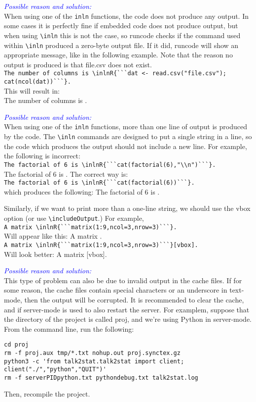 \documentclass[a4paper,10pt]{article}
\newcommand{\cause}[1] {\noindent\textit{\textcolor{blue}{Possible reason and solution:}}\\#1}
\begin{document}
\cause\bgroup
When using one of the \verb|inln| functions, the code does not produce any output.
In some cases it is perfectly fine if embedded code does not produce output, but when using \verb|\inln| this is not the case, so runcode checks if the command used within \verb|\inln| produced a zero-byte output file. If it did, runcode will show an appropriate message, like in the following example. Note that the reason no output is produced is that file.csv does not exist.\\
\verb|The number of columns is \inlnR{```dat <- read.csv("file.csv"); cat(ncol(dat))```}.|\\
This will result in:\\
The number of columns is  .\\
\egroup

\cause\bgroup
When using one of the \verb|inln| functions, more than one line of output is produced by the code.
The \verb|\inln| commands are designed to put a single string in a line, so the code which produces the output should not include a new line. For example, the following is incorrect:\\
\verb|The factorial of 6 is \inlnR{```cat(factorial(6),"\\n")```}.|\\
The factorial of 6 is .
\noindent
The correct way is:\\
\verb|The factorial of 6 is \inlnR{```cat(factorial(6))```}.|\\
which produces the following: 
The factorial of 6 is .


\noindent
Similarly, if we want to print more than a one-line string, we should use the vbox option (or use \verb|\includeOutput|.) For example,\\
\verb|A matrix \inlnR{```matrix(1:9,ncol=3,nrow=3)```}.|\\
Will appear like this: A matrix .
\\
\verb|A matrix \inlnR{```matrix(1:9,ncol=3,nrow=3)```}[vbox].|\\
Will look better: A matrix [vbox].
\egroup


\cause\bgroup
This type of problem can also be due to invalid output in the cache files. If for some reason, the cache files contain special characters or an underscore in text-mode, then the output will be corrupted. It is recommended to clear the cache, and if server-mode is used to also restart the server. For examplem, suppose that the directory of the project is called proj, and we're using Python in server-mode. From the command line, run the following:
\begin{Verbatim}
cd proj
rm -f proj.aux tmp/*.txt nohup.out proj.synctex.gz
python3 -c 'from talk2stat.talk2stat import client; client("./","python","QUIT")'
rm -f serverPIDpython.txt pythondebug.txt talk2stat.log
\end{Verbatim}
Then, recompile the project.\\
\egroup
\end{document}
